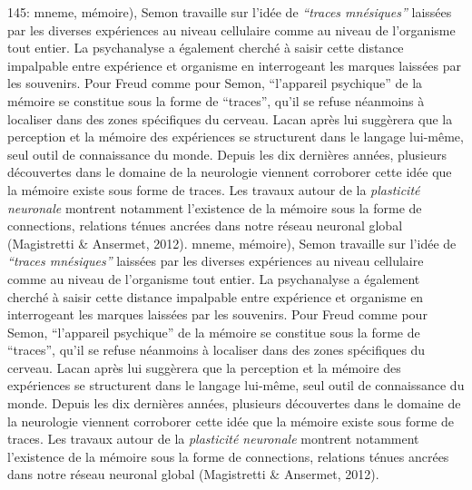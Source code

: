 145: mneme, m\'emoire), Semon travaille sur l{\textquoteright}id\'ee de \textit{{\textquotedblleft}traces mn\'esiques{\textquotedblright} }laiss\'ees par les diverses exp\'eriences au niveau cellulaire comme au niveau de l{\textquoteright}organisme tout entier. La psychanalyse a \'egalement cherch\'e \`a saisir cette distance impalpable entre exp\'erience et organisme en interrogeant les marques laiss\'ees par les souvenirs. Pour Freud comme pour Semon, {\textquotedblleft}l{\textquoteright}appareil psychique{\textquotedblright} de la m\'emoire se constitue sous la forme de {\textquotedblleft}traces{\textquotedblright}, qu{\textquoteright}il se refuse n\'eanmoins \`a localiser dans des zones sp\'ecifiques du cerveau. Lacan apr\`es lui sugg\`erera que la perception et la m\'emoire des exp\'eriences se structurent dans le langage lui-m\^eme, seul outil de connaissance du monde. Depuis les dix derni\`eres ann\'ees, plusieurs d\'ecouvertes dans le domaine de la neurologie viennent corroborer cette id\'ee que la m\'emoire existe sous forme de traces. Les travaux autour de la \textit{plasticit\'e neuronale }montrent notamment l{\textquoteright}existence de la m\'emoire sous la forme de connections, relations t\'enues ancr\'ees dans notre r\'eseau neuronal global (Magistretti \& Ansermet, 2012).  
mneme, m\'emoire), Semon travaille sur l{\textquoteright}id\'ee de \textit{{\textquotedblleft}traces mn\'esiques{\textquotedblright} }laiss\'ees par les diverses exp\'eriences au niveau cellulaire comme au niveau de l{\textquoteright}organisme tout entier. La psychanalyse a \'egalement cherch\'e \`a saisir cette distance impalpable entre exp\'erience et organisme en interrogeant les marques laiss\'ees par les souvenirs. Pour Freud comme pour Semon, {\textquotedblleft}l{\textquoteright}appareil psychique{\textquotedblright} de la m\'emoire se constitue sous la forme de {\textquotedblleft}traces{\textquotedblright}, qu{\textquoteright}il se refuse n\'eanmoins \`a localiser dans des zones sp\'ecifiques du cerveau. Lacan apr\`es lui sugg\`erera que la perception et la m\'emoire des exp\'eriences se structurent dans le langage lui-m\^eme, seul outil de connaissance du monde. Depuis les dix derni\`eres ann\'ees, plusieurs d\'ecouvertes dans le domaine de la neurologie viennent corroborer cette id\'ee que la m\'emoire existe sous forme de traces. Les travaux autour de la \textit{plasticit\'e neuronale }montrent notamment l{\textquoteright}existence de la m\'emoire sous la forme de connections, relations t\'enues ancr\'ees dans notre r\'eseau neuronal global (Magistretti \& Ansermet, 2012).  
